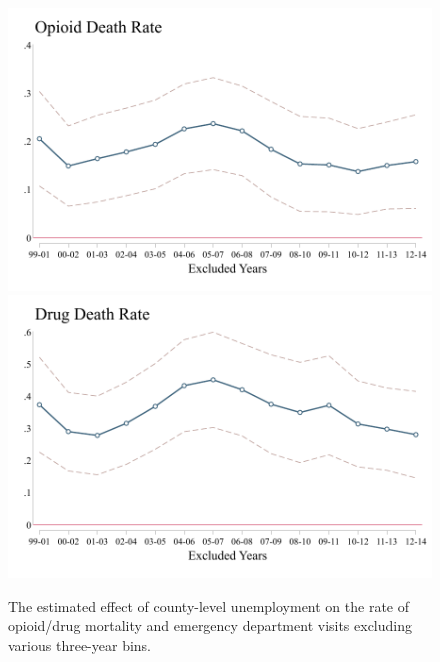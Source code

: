 \documentclass[12pt]{article}
\begin{document}
\FloatBarrier
\begin{figure}[h]
	\caption[Excluding three year bins]{The estimated effect of county-level unemployment on the rate of opioid/drug mortality and emergency department visits excluding various three-year bins.}
	\begin{minipage}[c]{0.48\linewidth}
		\centering
		\includegraphics[width=\linewidth]{../results/appendix/figures/aopioidr_drop_years.pdf}
	  	\includegraphics[width=\linewidth]{../results/appendix/figures/drugr_drop_years.pdf}

\end{minipage}
\end{figure}
\end{document}
